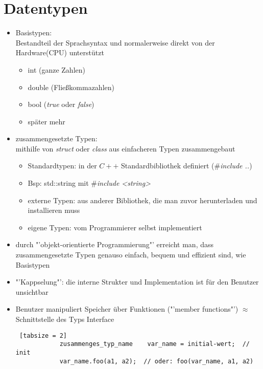 \documentclass{article}
\begin{document}
	\section{Datentypen}
	\begin{itemize}
		\item Basistypen:  \\
		Bestandteil der Sprachsyntax und normalerweise direkt von der Hardware(CPU) unterstützt
		\begin{itemize}
			\item int (ganze Zahlen)
			\item double (Fließkommazahlen)
			\item bool (\textit{true} oder \textit{false})
			\item später mehr
		\end{itemize}
		\item zusammengesetzte Typen: \\
		mithilfe von \textit{struct} oder \textit{class} aus einfacheren Typen zusammengebaut
		\begin{itemize}
			\item Standardtypen: in der $C++$ Standardbibliothek definiert (\#\textit{include ..})
			\item Bsp: std::string mit \#\textit{include <string>}
			\item externe Typen: aus anderer Bibliothek, die man zuvor herunterladen und installieren muss
			\item eigene Typen: vom Programmierer selbst implementiert
		\end{itemize}
		\item durch "'objekt-orientierte Programmierung"' erreicht man, dass zusammengesetzte Typen genauso einfach, bequem und effizient sind, wie Basistypen
		\item "'Kappselung"': die interne Strukter und Implementation ist für den Benutzer unsichtbar
		\item Benutzer manipuliert Speicher über Funktionen ("'member functions"') $\approx$ Schnittstelle des Typs Interface \\
		\begin{lstlisting} [tabsize = 2]
			zusammenges_typ_name    var_name = initial-wert;  // init
			var_name.foo(a1, a2);  // oder: foo(var_name, a1, a2)
		\end{lstlisting}
	\end{itemize}
	
\end{document}
